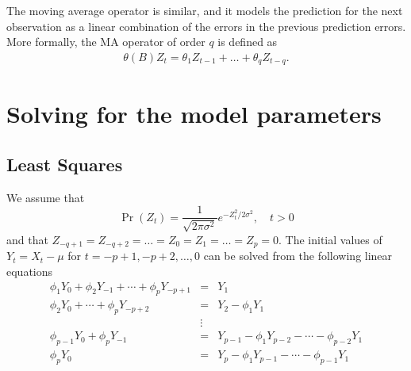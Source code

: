 The moving average operator is similar, and it models the prediction
for the next observation as a linear combination of the errors in the
previous prediction errors.  More formally, the MA operator of order
$q$ is defined as
\begin{align}
\theta(B) Z_t =   \theta_{1} Z_{t-1} + \dots + \theta_{q} Z_{t-q}.
\end{align}

\section{Solving for the model parameters}\label{sec:para_est}

\subsection{Least Squares}\label{sec:CLS}
We assume that
\begin{equation}
\Pr(Z_t) = \frac{1}{\sqrt{2 \pi \sigma^2}} e^{-Z^2_t/2 \sigma^2}, \quad t > 0
\end{equation}
and that  $Z_{-q+1} = Z_{-q+2} = \dots = Z_0 = Z_1 = \dots = Z_p =
0$. The initial values of $Y_t=X_t-\mu$ for $t=-p+1, -p+2, \dots,
0$ can be solved from the following linear equations
\begin{eqnarray}
\phi_1 Y_0 + \phi_2 Y_{-1} + \cdots + \phi_p Y_{-p+1} &=& Y_1 \nonumber\\
\phi_2 Y_0 + \cdots + \phi_p Y_{-p+2} &=& Y_2 - \phi_1 Y_1  \nonumber\\
&\vdots& \nonumber\\
\phi_{p-1} Y_0 + \phi_p Y_{-1} &=& Y_{p-1} - \phi_1 Y_{p-2} - \cdots -
\phi_{p-2} Y_1 \nonumber \\
\phi_p Y_0  &=& Y_p - \phi_1 Y_{p-1} - \cdots - \phi_{p-1} Y_{1} \label{eq:init_Y}
\end{eqnarray}


